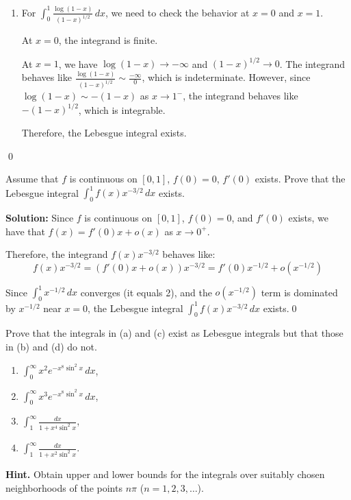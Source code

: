 \begin{enumerate}[label=(\alph*)]
    \item For $\int_{0}^{1} \frac{\log (1 - x)}{(1 - x)^{1/2}} \, dx$, we need to check the behavior at $x = 0$ and $x = 1$.
    
    At $x = 0$, the integrand is finite.
    
    At $x = 1$, we have $\log (1 - x) \to -\infty$ and $(1 - x)^{1/2} \to 0$. The integrand behaves like $\frac{\log (1 - x)}{(1 - x)^{1/2}} \sim \frac{-\infty}{0}$, which is indeterminate. However, since $\log (1 - x) \sim -(1 - x)$ as $x \to 1^-$, the integrand behaves like $-(1 - x)^{1/2}$, which is integrable.
    
    Therefore, the Lebesgue integral exists.
\end{enumerate}\qed


\begin{problembox}
Assume that $f$ is continuous on $[0, 1]$, $f(0) = 0$, $f'(0)$ exists. Prove that the Lebesgue integral $\int_{0}^{1} f(x)x^{-3/2} \, dx$ exists.
\end{problembox}

\bigskip\noindent\textbf{Solution:}
Since $f$ is continuous on $[0, 1]$, $f(0) = 0$, and $f'(0)$ exists, we have that $f(x) = f'(0)x + o(x)$ as $x \to 0^+$.

Therefore, the integrand $f(x)x^{-3/2}$ behaves like:
\[f(x)x^{-3/2} = (f'(0)x + o(x))x^{-3/2} = f'(0)x^{-1/2} + o(x^{-1/2})\]

Since $\int_{0}^{1} x^{-1/2} \, dx$ converges (it equals 2), and the $o(x^{-1/2})$ term is dominated by $x^{-1/2}$ near $x = 0$, the Lebesgue integral $\int_{0}^{1} f(x)x^{-3/2} \, dx$ exists.\qed


\begin{problembox}
Prove that the integrals in (a) and (c) exist as Lebesgue integrals but that those in (b) and (d) do not.
\begin{enumerate}[label=(\alph*)]
    \item $\int_{0}^{\infty} x^2 e^{-x^8 \sin^2 x} \, dx$,
    \item $\int_{0}^{\infty} x^3 e^{-x^8 \sin^2 x} \, dx$,
    \item $\int_{1}^{\infty} \frac{dx}{1 + x^4 \sin^2 x}$,
    \item $\int_{1}^{\infty} \frac{dx}{1 + x^2 \sin^2 x}.$
\end{enumerate}
\textbf{Hint.} Obtain upper and lower bounds for the integrals over suitably chosen neighborhoods of the points $n\pi$ ($n = 1, 2, 3, \ldots$).
\end{problembox}

